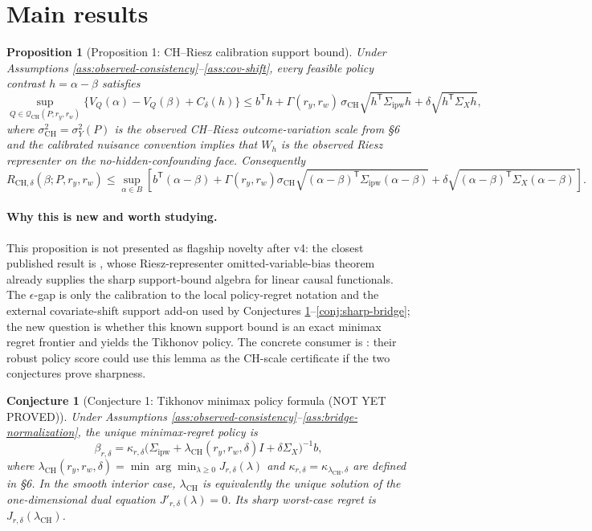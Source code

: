 \documentclass[11pt]{article}
\newcommand{\transpose}{\mathsf{T}}
\theoremstyle{definition}
\theoremstyle{plain}
\newtheorem{conjecture}{Conjecture}
\newtheorem{proposition}{Proposition}
\theoremstyle{remark}
\begin{document}
\section{Main results}
\begin{proposition}[Proposition 1: CH--Riesz calibration support bound]\label{prop:support}
Under Assumptions \ref{ass:observed-consistency}--\ref{ass:cov-shift}, every feasible policy contrast $h=\alpha-\beta$ satisfies
\[
  \sup_{Q\in\mathcal Q_{\mathrm{CH}}(P;r_y,r_w)}
  \{V_Q(\alpha)-V_Q(\beta)+C_\delta(h)\}
  \le
  b^\transpose h
  +\Gamma(r_y,r_w)\,\sigma_{\mathrm{CH}}
    \sqrt{h^\transpose\Sigma_{\mathrm{ipw}}h}
  +\delta\sqrt{h^\transpose\Sigma_Xh},
\]
where $\sigma_{\mathrm{CH}}^2=\sigma_Y^2(P)$ is the observed CH--Riesz outcome-variation scale from \S6 and the calibrated nuisance convention implies that $W_h$ is the observed Riesz representer on the no-hidden-confounding face. Consequently
\[
  R_{\mathrm{CH},\delta}(\beta;P,r_y,r_w)
  \le
  \sup_{\alpha\in B}\left[
  b^\transpose(\alpha-\beta)
  +\Gamma(r_y,r_w)\sigma_{\mathrm{CH}}
    \sqrt{(\alpha-\beta)^\transpose\Sigma_{\mathrm{ipw}}(\alpha-\beta)}
  +\delta\sqrt{(\alpha-\beta)^\transpose\Sigma_X(\alpha-\beta)}
  \right].
\]
\end{proposition}
\paragraph{Why this is new and worth studying.}
This proposition is not presented as flagship novelty after v4: the closest published result is \citet{ChernozhukovCinelliNeweySharmaSyrgkanis2022}, whose Riesz-representer omitted-variable-bias theorem already supplies the sharp support-bound algebra for linear causal functionals. The $\epsilon$-gap is only the calibration to the local policy-regret notation and the external covariate-shift support add-on used by Conjectures \ref{conj:tikhonov}--\ref{conj:sharp-bridge}; the new question is whether this known support bound is an exact minimax regret frontier and yields the Tikhonov policy. The concrete consumer is \citet{JinXuZhengZhou2025}: their robust policy score could use this lemma as the CH-scale certificate if the two conjectures prove sharpness.

\begin{conjecture}[Conjecture 1: Tikhonov minimax policy formula (NOT YET PROVED)]\label{conj:tikhonov}
Under Assumptions \ref{ass:observed-consistency}--\ref{ass:bridge-normalization}, the unique minimax-regret policy is
\[
  \beta_{r,\delta}
  =
  \kappa_{r,\delta}
  \bigl(\Sigma_{\mathrm{ipw}}+\lambda_{\mathrm{CH}}(r_y,r_w,\delta)I+\delta\Sigma_X\bigr)^{-1}b,
\]
where $\lambda_{\mathrm{CH}}(r_y,r_w,\delta)=\min\arg\min_{\lambda\ge0}J_{r,\delta}(\lambda)$ and $\kappa_{r,\delta}=\kappa_{\lambda_{\mathrm{CH}},\delta}$ are defined in \S6. In the smooth interior case, $\lambda_{\mathrm{CH}}$ is equivalently the unique solution of the one-dimensional dual equation $J'_{r,\delta}(\lambda)=0$. Its sharp worst-case regret is $J_{r,\delta}(\lambda_{\mathrm{CH}})$.
\end{conjecture}
\end{document}
